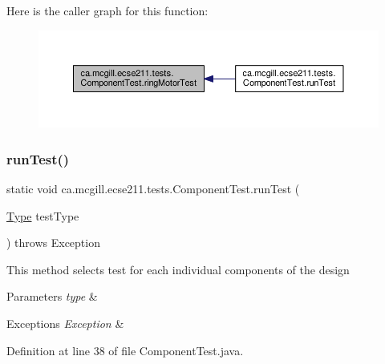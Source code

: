 Here is the caller graph for this function\+:
\nopagebreak
\begin{figure}[H]
\begin{center}
\leavevmode
\includegraphics[width=350pt]{enumca_1_1mcgill_1_1ecse211_1_1tests_1_1_component_test_a1ecca45b47067d825683cf46dcf22b62_icgraph}
\end{center}
\end{figure}
\mbox{\label{enumca_1_1mcgill_1_1ecse211_1_1tests_1_1_component_test_a5dc8bf97bc48adf5bee88d425a1a974e}} 
\subsubsection{\texorpdfstring{run\+Test()}{runTest()}}
{\footnotesize\ttfamily static void ca.\+mcgill.\+ecse211.\+tests.\+Component\+Test.\+run\+Test (\begin{DoxyParamCaption}\item[{\hyperlink{enumca_1_1mcgill_1_1ecse211_1_1tests_1_1_component_test_1_1_type}{Type}}]{test\+Type }\end{DoxyParamCaption}) throws Exception\hspace{0.3cm}{\ttfamily [static]}}

This method selects test for each individual components of the design


\begin{DoxyParams}{Parameters}
{\em type} & \\
\hline
\end{DoxyParams}

\begin{DoxyExceptions}{Exceptions}
{\em Exception} & \\
\hline
\end{DoxyExceptions}


Definition at line 38 of file Component\+Test.\+java.


